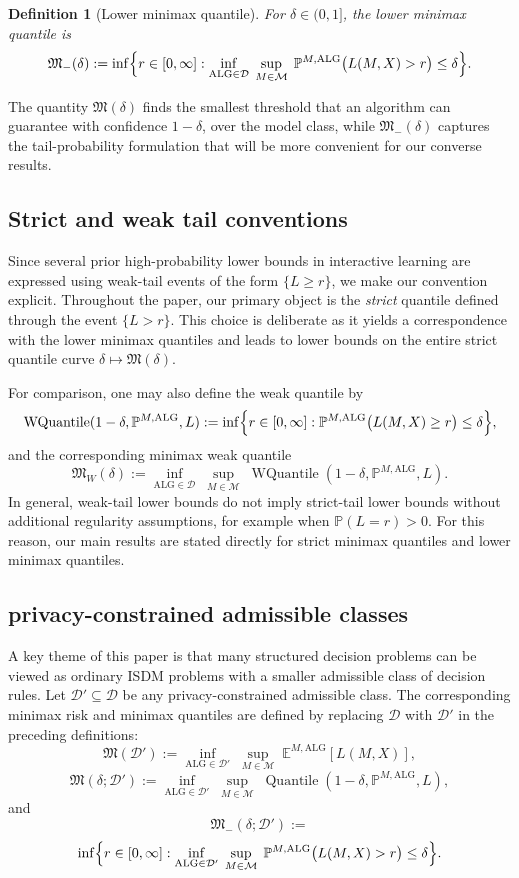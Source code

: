 \documentclass[journal]{IEEEtran}
\newtheorem{definition}{Definition}
\newcommand{\ALG}{\mathrm{ALG}}
\newcommand{\Quantile}{\operatorname{Quantile}}
\newcommand{\WQuantile}{\operatorname{WQuantile}}
\begin{document}
\begin{definition}[Lower minimax quantile]
For \(\delta\in(0,1]\), the lower minimax quantile is
\[
\mathfrak M_{-}(\delta)
:=
\inf\Bigl\{
r\in[0,\infty]:
\inf_{\ALG\in\mathcal D}\;
\sup_{M\in\mathcal M}\;
\mathbb P^{M,\ALG}\bigl(L(M,X)>r\bigr)\le \delta
\Bigr\}.
\]
\end{definition}

The quantity \(\mathfrak M(\delta)\) finds the smallest threshold that an algorithm can guarantee with confidence \(1-\delta\), over the model class, while \(\mathfrak M_{-}(\delta)\) captures the tail-probability formulation that will be more convenient for our converse results.

\subsection{Strict and weak tail conventions}

Since several prior high-probability lower bounds in interactive learning are expressed using weak-tail events of the form \(\{L\ge r\}\), we make our convention explicit. Throughout the paper, our primary object is the \emph{strict} quantile defined through the event \(\{L>r\}\). This choice is deliberate as it yields a correspondence with the lower minimax quantiles and leads to lower bounds on the entire strict quantile curve \(\delta\mapsto \mathfrak M(\delta)\).

For comparison, one may also define the weak quantile by
\[
\WQuantile(1-\delta,\mathbb P^{M,\ALG},L)
:=
\inf\Bigl\{
r\in[0,\infty]:
\mathbb P^{M,\ALG}\bigl(L(M,X)\ge r\bigr)\le \delta
\Bigr\},
\]
and the corresponding minimax weak quantile
\[
\mathfrak M_W(\delta)
:=
\inf_{\ALG\in\mathcal D}\;
\sup_{M\in\mathcal M}\;
\WQuantile(1-\delta,\mathbb P^{M,\ALG},L).
\]
In general, weak-tail lower bounds do not imply strict-tail lower bounds without additional regularity assumptions, for example when \(\mathbb P(L=r)>0\). For this reason, our main results are stated directly for strict minimax quantiles and lower minimax quantiles.

\iffalse
\subsection{privacy-constrained admissible classes}

A key theme of this paper is that many structured decision problems can be viewed as ordinary ISDM problems with a smaller admissible class of decision rules. Let \(\mathcal D'\subseteq \mathcal D\) be any privacy-constrained admissible class. The corresponding minimax risk and minimax quantiles are defined by replacing \(\mathcal D\) with \(\mathcal D'\) in the preceding definitions:
\[
\mathfrak M(\mathcal D')
:=
\inf_{\ALG\in\mathcal D'}\;
\sup_{M\in\mathcal M}\;
\mathbb E^{M,\ALG}[L(M,X)],
\]
\[
\mathfrak M(\delta;\mathcal D')
:=
\inf_{\ALG\in\mathcal D'}\;
\sup_{M\in\mathcal M}\;
\Quantile(1-\delta,\mathbb P^{M,\ALG},L),
\]
and
\[
\mathfrak M_{-}(\delta;\mathcal D')
:=\]
\[
\inf\Bigl\{
r\in[0,\infty]:
\inf_{\ALG\in\mathcal D'}\;
\sup_{M\in\mathcal M}\;
\mathbb P^{M,\ALG}\bigl(L(M,X)>r\bigr)\le \delta
\Bigr\}.
\]
\end{document}
